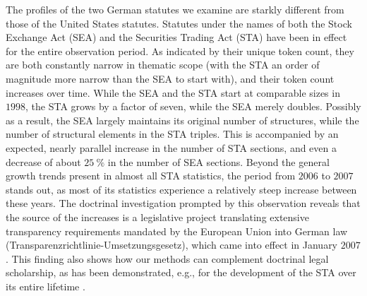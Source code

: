 The profiles of the two German statutes we examine are starkly different from those of the United States statutes.
Statutes under the names of both the Stock Exchange Act (SEA) and the Securities Trading Act (STA) have been in effect for the entire observation period.
As indicated by their unique token count, they are both constantly narrow in thematic scope (with the STA an order of magnitude more narrow than the SEA to start with), 
and their token count increases over time.
While the SEA and the STA start at comparable sizes in $1998$, the STA grows by a factor of seven, while the SEA merely doubles.
Possibly as a result, the SEA largely maintains its original number of structures,
while the number of structural elements in the STA triples.
This is accompanied by an expected, nearly parallel increase in the number of STA sections, 
and even a decrease of about $25~\%$ in the number of SEA sections.
Beyond the general growth trends present in almost all STA statistics,
the period from $2006$ to $2007$ stands out, as most of its statistics experience a relatively steep increase between these years.
The doctrinal investigation prompted by this observation reveals that the source of the increases is a legislative project translating extensive transparency requirements mandated by the European Union into German law (Transparenzrichtlinie-Umsetzungsgesetz), which came into effect in January $2007$.
This finding also shows how our methods can complement doctrinal legal scholarship, as has been demonstrated, e.g., for the development of the STA over its entire lifetime \cite{coupette2019a}.

